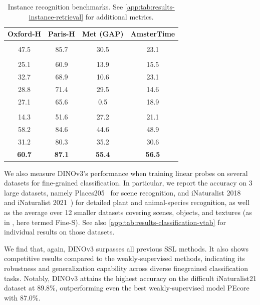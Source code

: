 \begin{table}[t]
    \begin{minipage}[b][][b]{.44\linewidth}
        \centering
        \small
        \caption{
            Instance recognition benchmarks. 
            See \cref{app:tab:results-instance-retrieval} for additional metrics.
        }
        \label{tab:results-instance-recognition}
        \setlength{\tabcolsep}{4pt}
        \begin{tabular}{@{}cccc@{}}
        \toprule
        Oxford-H & Paris-H & Met (GAP) & AmsterTime \\  %
        \midrule
        \\
        47.5 & 85.7 & 30.5 & 23.1 \\  %
        \midrule
        \\       
        25.1 & 60.9 & 13.9 & 15.5 \\  %
        32.7 & 68.9 & 10.6 & 23.1 \\  %
        28.8 & 71.4 & 29.5 & 14.6 \\  %
        27.1 & 65.6 &  0.5 & 18.9 \\  %
        \midrule
        \\
        14.3 & 51.6 & 27.2 & 21.1 \\  %
        58.2 & 84.6 & 44.6 & 48.9 \\  %
        31.2 & 80.3 & 35.2 & 30.6 \\  %
        \midrule
        \bf 60.7 & \bf 87.1 & \bf 55.4 & \bf 56.5 \\  %
        \bottomrule
        \end{tabular}
    \end{minipage}
\end{table}


We also measure DINOv3's performance when training linear probes on several datasets for fine-grained classification.
In particular, we report the accuracy on 3 large datasets, namely Places205~\citep{zhou2014learning} for scene recognition, and iNaturalist 2018~\citep{van2018inaturalist} and iNaturalist 2021~\citep{van2021benchmarking}) for detailed plant and animal-species recognition, as well as the average over 12 smaller datasets covering scenes, objects, and textures (as in \citet{oquab2024dinov2}, here termed Fine-S).
See also \cref{app:tab:results-classification-vtab} for individual results on those datasets.

We find that, again, DINOv3 surpasses all previous SSL methods.
It also shows competitive results compared to the weakly-supervised methods, indicating its robustness and generalization capability across diverse finegrained classification tasks.
Notably, DINOv3 attains the highest accuracy on the difficult iNaturalist21 dataset at 89.8\%, outperforming even the best weakly-supervised model PEcore with 87.0\%.

